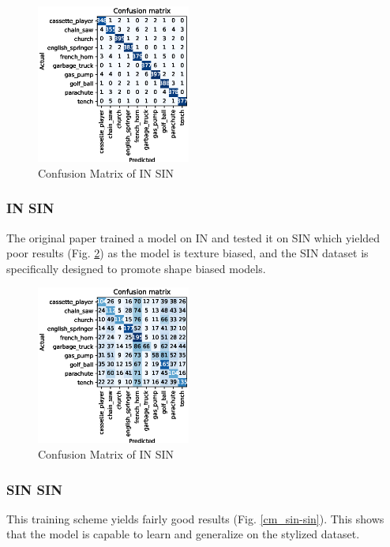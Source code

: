 \documentclass{article}
\begin{document}
\begin{figure}[h!]
  \includegraphics[width = 0.45\textwidth]{imgs/in/in-in/in-in_confusion_matrix_0.963.eps}
  \caption{Confusion Matrix of IN \texorpdfstring{\textrightarrow} .SIN}
  \label{cm_in-in}
\end{figure}

\subsubsection{IN \texorpdfstring{\textrightarrow} .SIN}



The original paper trained a model on IN and tested it on SIN which yielded poor results (Fig. \ref{cm_in-sin}) as 
the model is texture biased, and the SIN dataset is specifically designed to promote shape biased models.

\begin{figure}[h!]
  \includegraphics[width = 0.45\textwidth]{imgs/in/in-sin/in-sin_confusion_matrix_0.313.eps}
  \caption{Confusion Matrix of IN \texorpdfstring{\textrightarrow} .SIN}
  \label{cm_in-sin}
\end{figure}

\subsubsection{SIN \texorpdfstring{\textrightarrow} .SIN}
This training scheme yields fairly good results (Fig. \ref{cm_sin-sin}). This shows that the model is capable to learn
and generalize on the stylized dataset.
\end{document}
